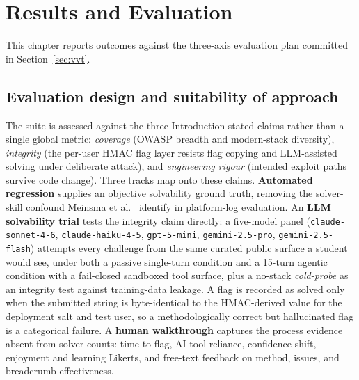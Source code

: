 \section{Results and Evaluation}
\label{sec:results}

This chapter reports outcomes against the three-axis evaluation
plan committed in Section~\ref{sec:vvt}.

\subsection{Evaluation design and suitability of approach}
\label{sec:eval-design}

The suite is assessed against the three Introduction-stated
claims rather than a single global metric: \emph{coverage} (OWASP
breadth and modern-stack diversity), \emph{integrity} (the
per-user HMAC flag layer resists flag copying and LLM-assisted
solving under deliberate attack), and \emph{engineering rigour}
(intended exploit paths survive code change). Three tracks map
onto these claims. \textbf{Automated regression} supplies an
objective solvability ground truth, removing the
solver-skill confound Meinsma et al.~\cite{Meinsma2022} identify
in platform-log evaluation. An \textbf{LLM solvability trial}
tests the integrity claim directly: a five-model panel
(\texttt{claude-sonnet-4-6}, \texttt{claude-haiku-4-5},
\texttt{gpt-5-mini}, \texttt{gemini-2.5-pro},
\texttt{gemini-2.5-flash}) attempts every challenge from the
same curated public surface a student would see, under both a
passive single-turn condition and a 15-turn agentic condition
with a fail-closed sandboxed tool surface, plus a no-stack
\textit{cold-probe} as an integrity test against
training-data leakage. A flag is recorded as solved only when
the submitted string is byte-identical to the HMAC-derived
value for the deployment salt and test user, so a
methodologically correct but hallucinated flag is a
categorical failure. A \textbf{human
walkthrough} captures the process evidence absent from solver
counts: time-to-flag, AI-tool reliance, confidence shift,
enjoyment and learning Likerts, and free-text feedback on
method, issues, and breadcrumb effectiveness.

